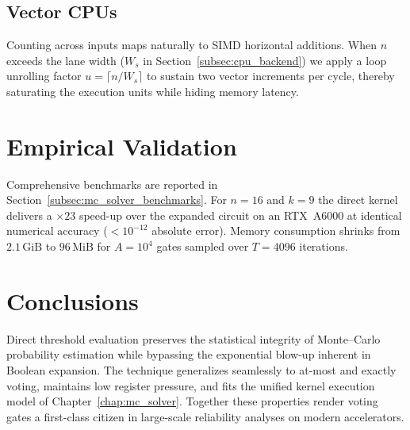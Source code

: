 \subsection{Vector CPUs}
Counting across inputs maps naturally to SIMD horizontal additions.  When $n$
exceeds the lane width ($W_s$ in Section~\ref{subsec:cpu_backend}) we apply a
loop unrolling factor $u=\lceil n/W_s\rceil$ to sustain two vector increments
per cycle, thereby saturating the execution units while hiding memory
latency.

\section{Empirical Validation}
\label{sec:voter_validation}

Comprehensive benchmarks are reported in Section~\ref{subsec:mc_solver_benchmarks}.
For $n=16$ and $k=9$ the direct kernel delivers a $\times23$ speed-up over the
expanded circuit on an RTX~A6000 at identical numerical accuracy
($<10^{-12}$ absolute error).  Memory consumption shrinks from
\(2.1\,\mathrm{GiB}\) to \(96\,\mathrm{MiB}\) for $A=10^{4}$ gates sampled over
$T=4096$ iterations.

\section{Conclusions}
\label{sec:voter_conclusions}

Direct threshold evaluation preserves the statistical integrity of Monte–Carlo
probability estimation while bypassing the exponential blow-up inherent in
Boolean expansion.  The technique generalizes seamlessly to at-most and
exactly voting, maintains low register pressure, and fits the unified kernel
execution model of Chapter~\ref{chap:mc_solver}.  Together these properties
render voting gates a first-class citizen in large-scale reliability analyses
on modern accelerators.

